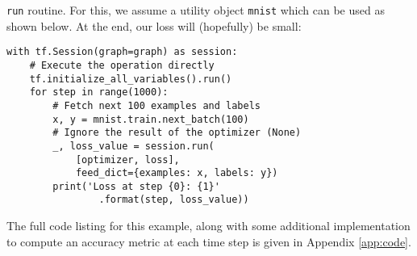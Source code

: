 \texttt{run} routine. For this, we assume a utility object \texttt{mnist} which
can be used as shown below. At the end, our loss will (hopefully) be small:
%
\begin{lstlisting}
with tf.Session(graph=graph) as session:
    # Execute the operation directly
    tf.initialize_all_variables().run()
    for step in range(1000):
        # Fetch next 100 examples and labels
        x, y = mnist.train.next_batch(100)
        # Ignore the result of the optimizer (None)
        _, loss_value = session.run(
            [optimizer, loss],
            feed_dict={examples: x, labels: y})
        print('Loss at step {0}: {1}'
                .format(step, loss_value))
\end{lstlisting}
%
The full code listing for this example, along with some additional
implementation to compute an accuracy metric at each time step is given in
Appendix \ref{app:code}.

